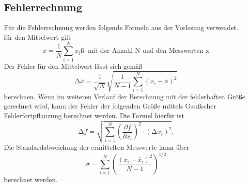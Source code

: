 \subsection{Fehlerrechnung}
\label{sec:Fehlerrechnung}
Für die Fehlerrechnung werden folgende Formeln aus der Vorlesung verwendet.
für den Mittelwert gilt
\begin{equation}
    \overline{x}=\frac{1}{N}\sum_{i=1}^N x_i ß\; \;\text{mit der Anzahl N und den Messwerten x} 
    \label{eqn:Mittelwert}
\end{equation}
Der Fehler für den Mittelwert lässt sich gemäß
\begin{equation}
    \increment \overline{x}=\frac{1}{\sqrt{N}}\sqrt{\frac{1}{N-1}\sum_{i=1}^N(x_i-\overline{x})^2}
    \label{eqn:FehlerMittelwert}
\end{equation}
berechnen.
Wenn im weiteren Verlauf der Berechnung mit der fehlerhaften Größe gerechnet wird, kann der Fehler der folgenden Größe
mittels Gaußscher Fehlerfortpflanzung berechnet werden. Die Formel hierfür ist
\begin{equation}
    \increment f= \sqrt{\sum_{i=1}^N\left(\frac{\partial f}{\partial x_i}\right)^2\cdot(\increment x_i)^2}.
    \label{eqn:GaussMittelwert}
\end{equation}
Die Standardabweichung der ermittelten Messwerte kann über 
\begin{equation}
    \sigma=\sum^{N}_{i=1}\left(\frac{(x_i-\bar{x}_i)^2}{N-1}\right)^{1/2}
    \label{eqn:Standardabweichung}
\end{equation}
berechnet werden.
